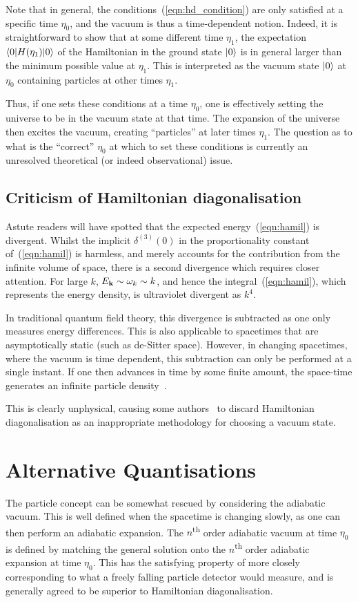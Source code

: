 Note that in general, the conditions~(\ref{eqn:hd_condition}) are only satisfied at a specific time $\eta_0$, and the vacuum is thus a time-dependent notion. 
Indeed, it is straightforward to show that at some different time $\eta_1$, the expectation $\left\langle0\middle|H(\eta_1)\middle|0\right\rangle$ of the Hamiltonian in the ground state $\left|0\right\rangle$ is in general larger than the minimum possible value at $\eta_1$. This is interpreted as the vacuum state $\left|0\right\rangle$ at $\eta_0$ containing particles at other times $\eta_1$.

Thus, if one sets these conditions at a time $\eta_0$, one is effectively setting the universe to be in the vacuum state at that time. The expansion of the universe then excites the vacuum, creating ``particles'' at later times $\eta_1$. The question as to what is the ``correct'' $\eta_0$ at which to set these conditions is currently an unresolved theoretical (or indeed observational) issue. 


\subsection{Criticism of Hamiltonian diagonalisation}

Astute readers will have spotted that the expected energy~(\ref{eqn:hamil}) is divergent. Whilst the implicit $\delta^{(3)}(0)$ in the proportionality constant of~(\ref{eqn:hamil}) is harmless, and merely accounts for the contribution from the infinite volume of space, there is a second divergence which requires closer attention. For large $k$, $E_{\mathbf{k}}\sim \omega_k \sim k$, and hence the integral~(\ref{eqn:hamil}), which represents the energy density, is ultraviolet divergent as $k^4$. 

In traditional quantum field theory, this divergence is subtracted as one only measures energy differences. This is also applicable to spacetimes that are asymptotically static (such as de-Sitter space).
However, in changing spacetimes, where the vacuum is time dependent, this subtraction can only be performed at a single instant. If one then advances in time by some finite amount, the space-time generates an infinite particle density~\cite{Fulling_HD,Fulling+1989}. 

This is clearly unphysical, causing some authors~\cite{Fulling_HD} to discard Hamiltonian diagonalisation as an inappropriate methodology for choosing a vacuum state.

\section{Alternative Quantisations}
The particle concept can be somewhat rescued by considering the adiabatic vacuum. This is well defined when the spacetime is changing slowly, as one can then perform an adiabatic expansion. The $n$\textsuperscript{th} order adiabatic vacuum at time $\eta_0$ is defined by matching the general solution onto the $n$\textsuperscript{th} order adiabatic expansion at time $\eta_0$. This has the satisfying property of more closely corresponding to what a freely falling particle detector would measure, and is generally agreed to be superior to Hamiltonian diagonalisation.

